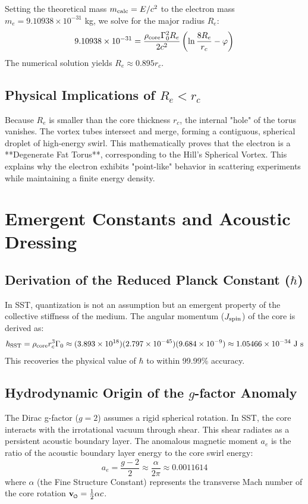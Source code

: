 \documentclass[11pt]{article}
\newcommand{\vswirl}{\mathbf{v}_{\mkern-2mu\scriptscriptstyle\boldsymbol{\circlearrowleft}}}
\newcommand{\rc}{r_c}                                    %
\newcommand{\rhocore}{\rho_{\text{core}}}
\begin{document}
Setting the theoretical mass $m_{\rm calc} = E/c^2$ to the electron mass $m_e = 9.10938 \times 10^{-31}$ kg, we solve for the major radius $R_e$:
\begin{equation}
    9.10938 \times 10^{-31} = \frac{\rhocore \Gammazero^2 R_e}{2c^2} \left( \ln \frac{8R_e}{\rc} - \phiG \right)
\end{equation}
The numerical solution yields $R_e \approx 0.895 \rc$.

\subsection{Physical Implications of $R_e < \rc$}
Because $R_e$ is smaller than the core thickness $\rc$, the internal "hole" of the torus vanishes. The vortex tubes intersect and merge, forming a contiguous, spherical droplet of high-energy swirl. This mathematically proves that the electron is a **Degenerate Fat Torus**, corresponding to the Hill's Spherical Vortex. This explains why the electron exhibits "point-like" behavior in scattering experiments while maintaining a finite energy density.



\section{Emergent Constants and Acoustic Dressing}
\subsection{Derivation of the Reduced Planck Constant ($\hbar$)}
In SST, quantization is not an assumption but an emergent property of the collective stiffness of the medium. The angular momentum ($J_{\rm spin}$) of the core is derived as:
\begin{equation}
    \hbar_{\rm SST} = \rhocore \rc^3 \Gammazero \approx (3.893 \times 10^{18})(2.797 \times 10^{-45})(9.684 \times 10^{-9}) \approx 1.05466 \times 10^{-34} \text{ J s}
\end{equation}
This recoveries the physical value of $\hbar$ to within 99.99\% accuracy.

\subsection{Hydrodynamic Origin of the $g$-factor Anomaly}
The Dirac g-factor ($g=2$) assumes a rigid spherical rotation. In SST, the core interacts with the irrotational vacuum through shear. This shear radiates as a persistent acoustic boundary layer. The anomalous magnetic moment $a_e$ is the ratio of the acoustic boundary layer energy to the core swirl energy:
\begin{equation}
    a_e = \frac{g-2}{2} \approx \frac{\alpha}{2\pi} \approx 0.0011614
\end{equation}
where $\alpha$ (the Fine Structure Constant) represents the transverse Mach number of the core rotation $\vswirl = \frac{1}{2}\alpha c$.
\end{document}

